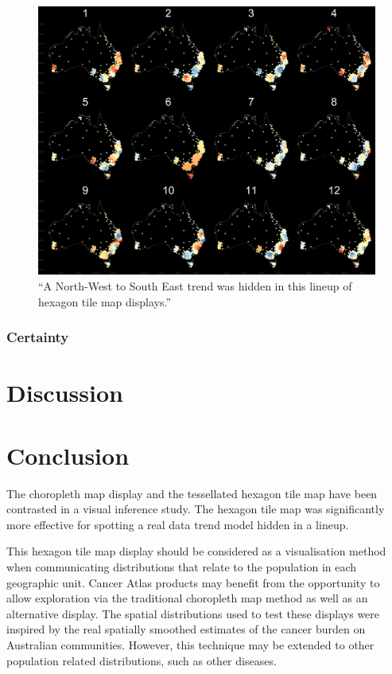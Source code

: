 \documentclass[conference,final,]{IEEEtran}
\makeatletter
\def\maxwidth{\ifdim\Gin@nat@width>\linewidth\linewidth
\else\Gin@nat@width\fi}
\let\Oldincludegraphics\includegraphics
\renewcommand{\includegraphics}[1]{\Oldincludegraphics[width=\maxwidth]{#1}}
\makeatother
\begin{document}
\begin{figure}
\centering
\includegraphics{figures/aus_nwse_6_hex.png}
\caption{``A North-West to South East trend was hidden in this lineup of hexagon tile map displays.''}
\end{figure}

\hypertarget{certainty-1}{%
\subsubsection{Certainty}\label{certainty-1}}

\hypertarget{discussion}{%
\section{Discussion}\label{discussion}}

\hypertarget{conclusion}{%
\section{Conclusion}\label{conclusion}}

The choropleth map display and the tessellated hexagon tile map have been contrasted in a visual inference study.
The hexagon tile map was significantly more effective for spotting a real data trend model hidden in a lineup.

This hexagon tile map display should be considered as a visualisation method when communicating distributions that relate to the population in each geographic unit. Cancer Atlas products may benefit from the opportunity to allow exploration via the traditional choropleth map method as well as an alternative display. The spatial distributions used to test these displays were inspired by the real spatially smoothed estimates of the cancer burden on Australian communities. However, this technique may be extended to other population related distributions, such as other diseases.
\end{document}
